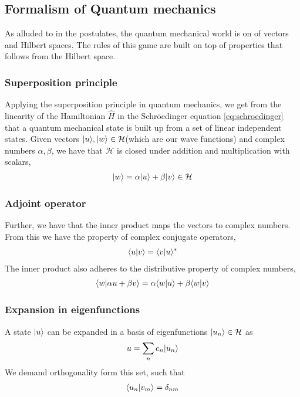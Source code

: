 \subsection{Formalism of Quantum mechanics}
As alluded to in the postulates, the quantum mechanical world is on of vectors and Hilbert spaces. The rules of this game are built on top of properties that follows from the Hilbert space.

\subsubsection{Superposition principle}
Applying the superposition principle in quantum mechanics, we get from the linearity of the Hamiltonian $\hat{H}$ in the Schröedinger equation \eqref{eq:schroedinger} that a quantum mechanical state is built up from a set of linear independent states. Given vectors $|{u}\rangle,|{w}\rangle \in \mathcal{H}$(which are our wave functions) and complex numbers $\alpha,\beta$, we have that $\mathcal{H}$ is closed under addition and multiplication with scalars,
\begin{align}
	|{w}\rangle = \alpha|{u}\rangle + \beta|{v}\rangle \in \mathcal{H}
	\label{eq:hilbert_linearity}
\end{align}

\subsubsection{Adjoint operator}
Further, we have that the inner product maps the vectors to complex numbers. From this we have the property of complex conjugate operators,
\begin{align}
	\langle{u}|v\rangle = \langle{v}|u\rangle^*
	\label{eq:complex_conjugate}
\end{align}
The inner product also adheres to the distributive property of complex numbers,
\begin{align}
	\langle{w}|\alpha u + \beta v\rangle = \alpha\langle{w}|u\rangle + \beta\langle{w}|v\rangle
	\label{eq:distributive_property}
\end{align}

\subsubsection{Expansion in eigenfunctions}
A state $|{u}\rangle$ can be expanded in a basis of eigenfunctions $|{u_n}\rangle \in \mathcal{H}$ as
\begin{align}
	u = \sum_n c_n |{u_n}\rangle
	\label{eq:eigenfunction-expansion}
\end{align}
We demand orthogonality form this set, such that 
\begin{align}
	\langle{u_n}|v_m\rangle = \delta_{nm}
	\label{eq:eig-func-orthogonality}
\end{align}

